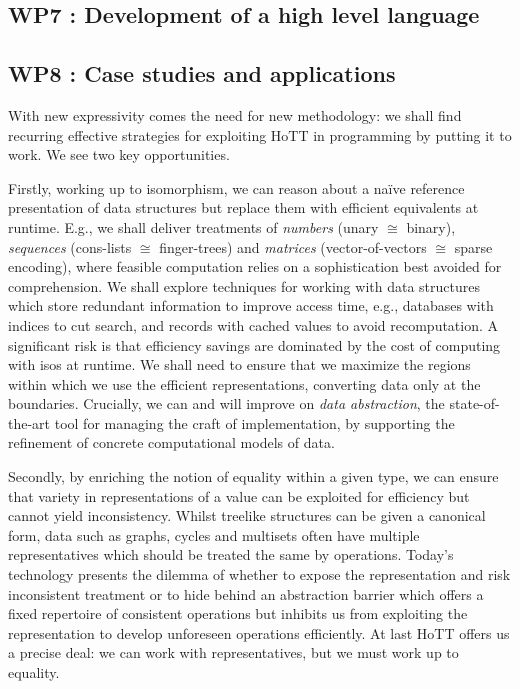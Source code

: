 \documentclass[twocolumn,a4paper,11pt]{article}
\newcommand{\iso}{\cong}
\begin{document}
\subsection*{WP7 : Development of a high level language} 

\subsection*{WP8 : Case studies and applications} 

With new expressivity comes the need for new
methodology: we shall find recurring effective strategies for
exploiting HoTT in programming by putting it to work. We see two
key opportunities.

Firstly, working up to isomorphism, we can reason about a na\"ive
reference presentation of data structures but replace them with
efficient equivalents at runtime. E.g., we shall deliver treatments of
\emph{numbers} (unary $\iso$ binary), \emph{sequences} (cons-lists
$\iso$ finger-trees) and \emph{matrices} (vector-of-vectors $\iso$
sparse encoding), where feasible computation relies on a
sophistication best avoided for comprehension. We shall explore
techniques for working with data structures which store redundant
information to improve access time, e.g., databases with indices to
cut search, and records with cached values to avoid recomputation. A
significant risk is that efficiency savings are dominated by the cost
of computing with isos at runtime. We shall need to ensure that we
maximize the regions within which we use the efficient
representations, converting data only at the boundaries.  Crucially,
we can and will improve on \emph{data abstraction}, the
state-of-the-art tool for managing the craft of implementation, by
supporting the refinement of concrete computational models of data.

Secondly, by enriching the notion of equality within a given type, we
can ensure that variety in representations of a value can be exploited
for efficiency but cannot yield inconsistency. Whilst treelike
structures can be given a canonical form, data such as graphs, cycles
and multisets often have multiple representatives which should be
treated the same by operations. Today's technology presents the
dilemma of whether to expose the representation and risk inconsistent
treatment or to hide behind an abstraction barrier which offers a
fixed repertoire of consistent operations but inhibits us from
exploiting the representation to develop unforeseen operations
efficiently. At last HoTT offers us a precise deal: we can work with
representatives, but we must work up to equality.
\end{document}
